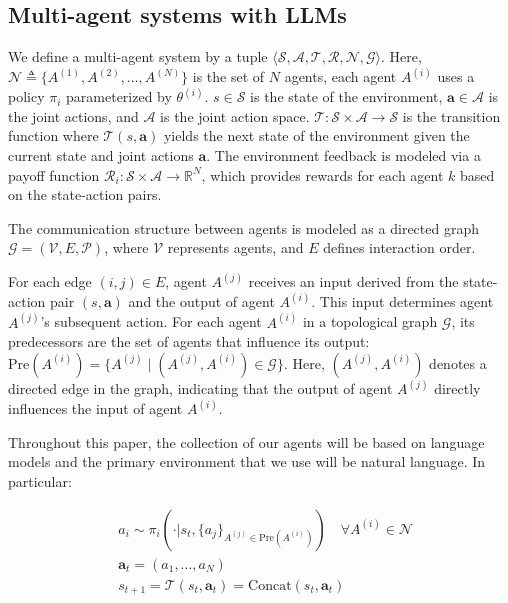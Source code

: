 \subsection{Multi-agent systems with LLMs}  
We define a multi-agent system by a tuple $\langle \mathcal{S}, \mathcal{A}, \mathcal{T}, \mathcal{R}, \mathcal{N}, \mathcal{G} \rangle$. Here, $\mathcal{N} \triangleq \{A^{(1)}, A^{(2)}, \ldots, A^{(N)}\}$ is the set of $N$ agents, each agent $A^{(i)}$ uses a policy $\pi_i$ parameterized by $\theta^{(i)}$. $s \in \mathcal{S}$ is the state of the environment, $\mathbf{a} \in \mathcal{A}$ is the joint actions, and $\mathcal{A}$ is the joint action space. $\mathcal{T}: \mathcal{S} \times \mathcal{A} \to \mathcal{S}$ is the transition function where $\mathcal{T}(s, \mathbf{a})$ yields the next state of the environment given the current state and joint actions $\mathbf{a}$. The environment feedback is modeled via a payoff function $\mathcal{R}_i: \mathcal{S} \times \mathcal{A} \to \mathbb{R}^N$, which provides rewards for each agent $k$ based on the state-action pairs. 

The communication structure between agents is modeled as a directed graph $\mathcal{G} = (\mathcal{V}, E, \mathcal{P})$, where $\mathcal{V}$ represents agents, and $E$ defines interaction order. 

For each edge $(i, j) \in E$, agent $A^{(j)}$ receives an input derived from the state-action pair $(s, \mathbf{a})$ and the output of agent $A^{(i)}$. This input determines agent $A^{(j)}$'s subsequent action. For each agent $A^{(i)}$ in a topological graph $\mathcal{G}$, its predecessors are the set of agents that  influence its output:
$\mathrm{Pre}(A^{(i)}) = \{A^{(j)} \mid (A^{(j)}, A^{(i)}) \in \mathcal{G}\}.$ Here, $(A^{(j)}, A^{(i)})$ denotes a directed edge in the graph, indicating that the output of agent $A^{(j)}$ directly influences the input of agent $A^{(i)}$.



Throughout this paper, the collection of our agents will be based on language models and the primary environment that we use will be natural language. In particular:

\begin{equation}
   \begin{aligned}
    & a_i \sim \pi_i(\cdot | s_{t}, \{a_j\}_{A^{(j)} \in \mathrm{Pre}(A^{(i)})}) \quad \forall A^{(i)}\in \mathcal{N} \\
    & \mathbf{a}_t = (a_1, ..., a_N) \\
    & s_{t+1} = \mathcal{T}(s_t, \mathbf{a}_t) = \text{Concat}(s_t, \mathbf{a}_t)
   \end{aligned}
\end{equation}


